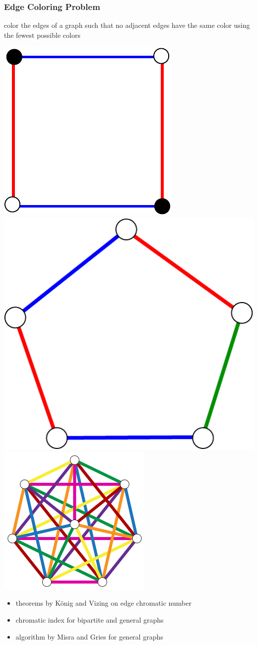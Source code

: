 \documentclass[titlepage,german,presentation]{beamer}
\begin{document}
  
\begin{frame}
\frametitle{Edge Coloring Problem}

\begin{block}{}
  color the edges of a graph such that no adjacent edges have the same color using
  the fewest possible colors
  \end{block}
\begin{center}
\includegraphics[height=0.25\textwidth]{square}\quad
\includegraphics[height=0.25\textwidth]{pentagon}\quad
\includegraphics[height=0.3\textwidth]{K7.png}

\end{center}


\begin{itemize}
\item theorems by K\"{o}nig and Vizing on edge chromatic number~\cite{daglib12}
  \item chromatic index for bipartite and general graphs~\cite{daglib12}
  \item algorithm by Misra and Gries for general graphs~\cite{Misra92}
\end{itemize}

\end{frame}
\end{document}
